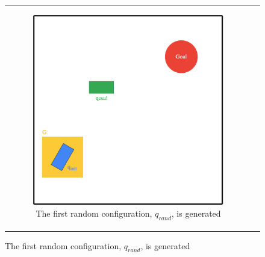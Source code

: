 \begin{figure}[H]
\begin{center}
\begin{tabular}{c c}
\begin{subfigure}{0.45\textwidth}
    \includegraphics[width=\linewidth]{chapters/chapter2/img/RRT_step_by_step-B.png}
    \caption{The first random configuration, $q_{rand}$, is generated}
    \label{subfig:rrt-step-by-step-B}
    \end{subfigure} \\


\end{tabular}
\end{center}
\end{figure}

